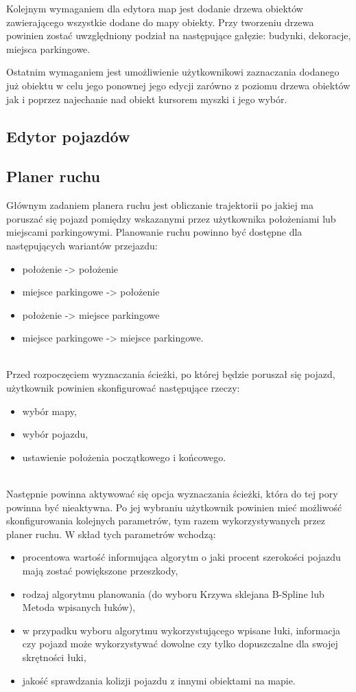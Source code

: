 \documentclass[a4paper,11pt,twoside]{report}
\theoremstyle{definition}
\begin{document}
Kolejnym wymaganiem dla edytora map jest dodanie drzewa obiektów zawierającego wszystkie dodane do mapy obiekty. Przy tworzeniu drzewa powinien zostać uwzględniony podział na następujące gałęzie: budynki, dekoracje, miejsca parkingowe. 

Ostatnim wymaganiem jest umożliwienie użytkownikowi zaznaczania dodanego już obiektu w celu jego ponownej jego edycji zarówno z poziomu drzewa obiektów jak i poprzez najechanie nad obiekt kursorem myszki i jego wybór.

\subsection{Edytor pojazdów}


\subsection{Planer ruchu}

Głównym zadaniem planera ruchu jest obliczanie trajektorii po jakiej ma poruszać się pojazd pomiędzy wskazanymi przez użytkownika położeniami lub miejscami parkingowymi. Planowanie ruchu powinno być dostępne dla następujących wariantów przejazdu:
\begin{itemize}
	\item położenie -> położenie
	\item miejsce parkingowe -> położenie
	\item położenie -> miejsce parkingowe
	\item miejsce parkingowe -> miejsce parkingowe.
\end{itemize}

~\\Przed rozpoczęciem wyznaczania ścieżki, po której będzie poruszał się pojazd, użytkownik powinien skonfigurować następujące rzeczy:
\begin{itemize}
	\item wybór mapy,
	\item wybór pojazdu,
	\item ustawienie położenia początkowego i końcowego.
\end{itemize}

~\\Następnie powinna aktywować się opcja wyznaczania ścieżki, która do tej pory powinna być nieaktywna. Po jej wybraniu użytkownik powinien mieć możliwość skonfigurowania kolejnych parametrów, tym razem wykorzystywanych przez planer ruchu. W skład tych parametrów wchodzą:
\begin{itemize}
	\item procentowa wartość informująca algorytm o jaki procent szerokości pojazdu mają zostać powiększone przeszkody,
	\item rodzaj algorytmu planowania (do wyboru Krzywa sklejana B-Spline lub Metoda wpisanych łuków),
	\item w przypadku wyboru algorytmu wykorzystującego wpisane łuki, informacja czy pojazd może wykorzystywać dowolne czy tylko dopuszczalne dla swojej skrętności łuki,
	\item jakość sprawdzania kolizji pojazdu z innymi obiektami na mapie.
\end{itemize}
\end{document}

